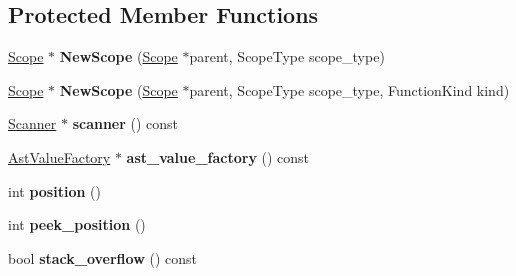 \subsection*{Protected Member Functions}
\begin{DoxyCompactItemize}
\item 
\hyperlink{classv8_1_1internal_1_1_scope}{Scope} $\ast$ {\bfseries New\+Scope} (\hyperlink{classv8_1_1internal_1_1_scope}{Scope} $\ast$parent, Scope\+Type scope\+\_\+type)\hypertarget{classv8_1_1internal_1_1_parser_base_af1b8da4d4ca9622b9703c04af15d4586}{}\label{classv8_1_1internal_1_1_parser_base_af1b8da4d4ca9622b9703c04af15d4586}

\item 
\hyperlink{classv8_1_1internal_1_1_scope}{Scope} $\ast$ {\bfseries New\+Scope} (\hyperlink{classv8_1_1internal_1_1_scope}{Scope} $\ast$parent, Scope\+Type scope\+\_\+type, Function\+Kind kind)\hypertarget{classv8_1_1internal_1_1_parser_base_a0489e588943cdd68f063a16576917004}{}\label{classv8_1_1internal_1_1_parser_base_a0489e588943cdd68f063a16576917004}

\item 
\hyperlink{classv8_1_1internal_1_1_scanner}{Scanner} $\ast$ {\bfseries scanner} () const \hypertarget{classv8_1_1internal_1_1_parser_base_a586801814bb34b65c526fbc368aa7fc1}{}\label{classv8_1_1internal_1_1_parser_base_a586801814bb34b65c526fbc368aa7fc1}

\item 
\hyperlink{classv8_1_1internal_1_1_ast_value_factory}{Ast\+Value\+Factory} $\ast$ {\bfseries ast\+\_\+value\+\_\+factory} () const \hypertarget{classv8_1_1internal_1_1_parser_base_ae528fe16c4d800954cb840fc6458e214}{}\label{classv8_1_1internal_1_1_parser_base_ae528fe16c4d800954cb840fc6458e214}

\item 
int {\bfseries position} ()\hypertarget{classv8_1_1internal_1_1_parser_base_aa9d7a17bbfc644aa904b8ffe7b42576e}{}\label{classv8_1_1internal_1_1_parser_base_aa9d7a17bbfc644aa904b8ffe7b42576e}

\item 
int {\bfseries peek\+\_\+position} ()\hypertarget{classv8_1_1internal_1_1_parser_base_a5df676d4e307a57fdf65ef4e9c200ee5}{}\label{classv8_1_1internal_1_1_parser_base_a5df676d4e307a57fdf65ef4e9c200ee5}

\item 
bool {\bfseries stack\+\_\+overflow} () const \hypertarget{classv8_1_1internal_1_1_parser_base_aeb0dcd37b3d2c431623c3628aa1eaf82}{}\label{classv8_1_1internal_1_1_parser_base_aeb0dcd37b3d2c431623c3628aa1eaf82}


\end{DoxyCompactItemize}
